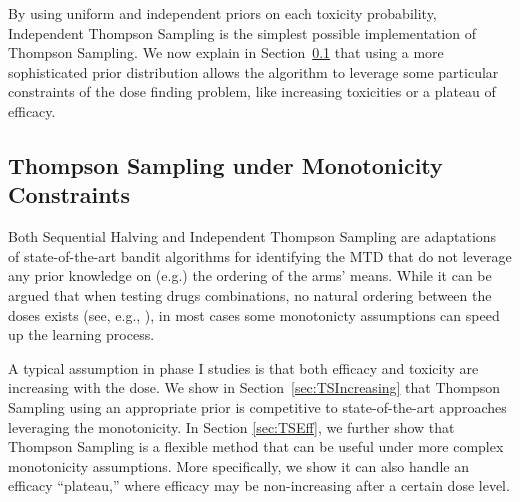 % 

By using uniform and independent priors on each toxicity probability, Independent Thompson Sampling is the simplest possible implementation of Thompson Sampling. We now explain in Section~\ref{sec:TS} that using a more sophisticated prior distribution allows the algorithm to leverage some particular constraints of the dose finding problem, like increasing toxicities or a plateau of efficacy.  



\subsection{Thompson Sampling under Monotonicity Constraints}\label{sec:TS}

Both Sequential Halving and Independent Thompson Sampling are adaptations of state-of-the-art bandit algorithms for identifying the MTD that do not leverage any prior knowledge on (e.g.) the ordering of the arms' means. While it can be argued that when testing drugs combinations, no natural ordering between the doses exists (see, e.g., \cite{Mozgunov17CT}), in most cases some monotonicty assumptions can speed up the learning process. 

A typical assumption in phase I studies is that both efficacy and toxicity are increasing with the dose. We show in Section~\ref{sec:TSIncreasing} that Thompson Sampling using an appropriate prior is competitive to state-of-the-art approaches leveraging the monotonicity. In Section \ref{sec:TSEff}, we further show that Thompson Sampling is a flexible method that can be useful under more complex monotonicity assumptions. More specifically, we show it can also handle an efficacy ``plateau,'' where efficacy may be non-increasing after a certain dose level.   

